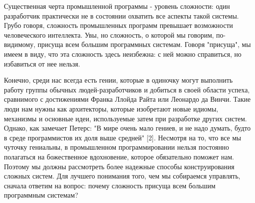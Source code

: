 \documentclass[a4paper,12pt]{article}
\begin{document}
\begin{small}
Существенная черта промышленной программы - уровень сложности: один разработчик практически не в состоянии охватить все аспекты такой системы. Грубо говоря, сложность промышленных программ превышает возможности человеческого интеллекта. Увы, но сложность, о которой мы говорим, по-видимому, присуща всем большим программных системам. Говоря "присуща", мы имеем в виду, что эта сложность здесь неизбежна: с ней можно справиться, но избавиться от нее нельзя. \par \medskip
Конечно, среди нас всегда есть гении, которые в одиночку могут выполнить работу группы обычных людей-разработчиков и добиться в своей области успеха, сравнимого с достижениями Франка Ллойда Райта или Леонардо да Винчи. Такие люди нам нужны как архитекторы, которые изобретают новые идиомы, механизмы и основные идеи, используемые затем при разработке других систем. Однако, как замечает Петерс: "В мире очень мало гениев, и не надо думать, будто в среде программистов их доля выше средней" [2]. Несмотря на то, что все мы чуточку гениальны, в промышленном программировании нельзя постоянно полагаться на божественное вдохновение, которое обязательно поможет нам. Поэтому мы должны рассмотреть более надежные способы конструирования сложных систем. Для лучшего понимания того, чем мы собираемся управлять, сначала ответим на вопрос: почему сложность присуща всем большим программным системам? 
\end{small}
\end{document}
